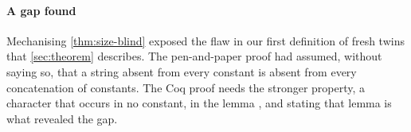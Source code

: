 \paragraph{A gap found} Mechanising \cref{thm:size-blind} exposed the flaw in our
first definition of fresh twins that \cref{sec:theorem} describes. The pen-and-paper
proof had assumed, without saying so, that a string absent from every constant is
absent from every concatenation of constants. The Coq proof needs the stronger
property, a character that occurs in no constant, in the lemma
, and stating that lemma is what revealed the gap.
